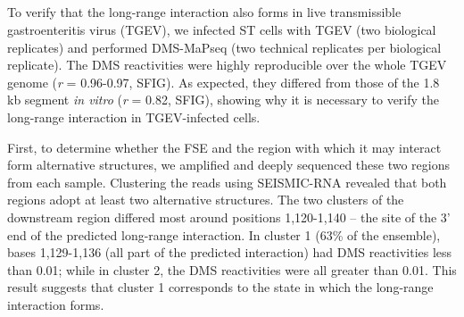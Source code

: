 \documentclass[main.tex]{subfiles}
\begin{document}
\subsection{}

To verify that the long-range interaction also forms in live transmissible gastroenteritis virus (TGEV), we infected ST cells with TGEV (two biological replicates) and performed DMS-MaPseq (two technical replicates per biological replicate).
The DMS reactivities were highly reproducible over the whole TGEV genome (\textit{r} = 0.96-0.97, SFIG).
As expected, they differed from those of the 1.8 kb segment \textit{in vitro} (\textit{r} = 0.82, SFIG), showing why it is necessary to verify the long-range interaction in TGEV-infected cells.

First, to determine whether the FSE and the region with which it may interact form alternative structures, we amplified and deeply sequenced these two regions from each sample.
Clustering the reads using SEISMIC-RNA revealed that both regions adopt at least two alternative structures.
The two clusters of the downstream region differed most around positions 1,120-1,140 -- the site of the 3' end of the predicted long-range interaction.
In cluster 1 (63\% of the ensemble), bases 1,129-1,136 (all part of the predicted interaction) had DMS reactivities less than 0.01; while in cluster 2, the DMS reactivities were all greater than 0.01.
This result suggests that cluster 1 corresponds to the state in which the long-range interaction forms.
\end{document}
